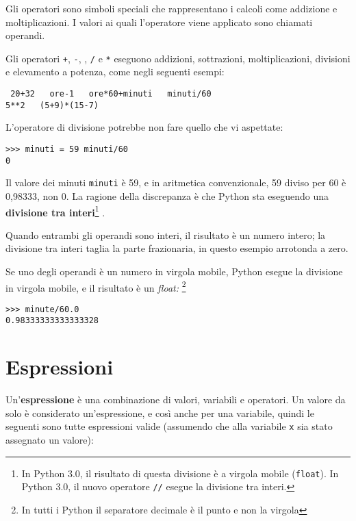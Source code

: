 Gli operatori sono simboli speciali che rappresentano i calcoli come
addizione e moltiplicazioni. I valori ai quali l'operatore viene
applicato sono chiamati operandi.


Gli operatori {\tt +}, {\tt -}, {\tt *}, {\tt /} e {\tt **} eseguono
addizioni, sottrazioni, moltiplicazioni, divisioni e elevamento a
potenza, come negli seguenti esempi:


\beforeverb \begin{verbatim} 20+32   ore-1   ore*60+minuti   minuti/60  
5**2   (5+9)*(15-7) \end{verbatim} \afterverb
%
L'operatore di divisione potrebbe non fare quello che vi aspettate:

\beforeverb \begin{verbatim}
>>> minuti = 59 minuti/60
0 \end{verbatim} \afterverb
%
Il valore dei minuti  {\tt minuti} \`{e}  59, e in aritmetica
convenzionale,  59 diviso per 60 \`{e} 0,98333, non 0. La ragione della
discrepanza \`{e} che Python sta eseguendo una \textbf{divisione tra
interi}\footnote{	 In Python 3.0, il risultato di questa divisione
\`{e} a virgola mobile ({\tt float}). In Python 3.0, il nuovo operatore
{\tt //} esegue la divisione tra interi.} .

  
 

Quando entrambi gli operandi sono interi, il risultato \`{e} un numero
intero; la divisione tra interi taglia la parte frazionaria, in questo
esempio arrotonda a zero.


Se uno degli operandi \`{e} un numero in virgola mobile, Python esegue
la divisione in virgola mobile, e il risultato \`{e} un \emph{float:}
\footnote{In tutti i Python il separatore decimale \`{e} il punto e non
la virgola }


\beforeverb \begin{verbatim}
>>> minute/60.0
0.98333333333333328 \end{verbatim} \afterverb


\section{Espressioni}

Un'\textbf{espressione }\`{e} una combinazione di valori, variabili e
operatori. Un valore da solo \`{e} considerato un'espressione, e
cos\`{i} anche per una variabile, quindi le seguenti sono tutte
espressioni valide (assumendo che alla variabile {\tt x} sia stato
assegnato un valore):

